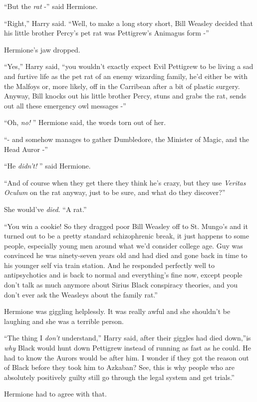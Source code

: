 ``But the \emph{rat} -'' said Hermione.

``Right,'' Harry said. ``Well, to make a long story short, Bill Weasley
decided that his little brother Percy's pet rat was Pettigrew's Animagus
form -''

Hermione's jaw dropped.

``Yes,'' Harry said, ``you wouldn't exactly expect Evil Pettigrew to be
living a sad and furtive life as the pet rat of an enemy wizarding
family, he'd either be with the Malfoys or, more likely, off in the
Carribean after a bit of plastic surgery. Anyway, Bill knocks out his
little brother Percy, stuns and grabs the rat, sends out all these
emergency owl messages -''

``Oh, \emph{no!} '' Hermione said, the words torn out of her.

``- and somehow manages to gather Dumbledore, the Minister of Magic, and
the Head Auror -''

``He \emph{didn't!} '' said Hermione.

``And of course when they get there they think he's crazy, but they use
\emph{Veritas Oculum} on the rat anyway, just to be sure, and what do
they discover?''

She would've \emph{died}. ``A rat.''

``You win a cookie! So they dragged poor Bill Weasley off to St. Mungo's
and it turned out to be a pretty standard schizophrenic break, it just
happens to some people, especially young men around what we'd consider
college age. Guy was convinced he was ninety-seven years old and had
died and gone back in time to his younger self via train station. And he
responded perfectly well to antipsychotics and is back to normal and
everything's fine now, except people don't talk as much anymore about
Sirius Black conspiracy theories, and you don't ever ask the Weasleys
about the family rat.''

Hermione was giggling helplessly. It was really awful and she shouldn't
be laughing and she was a terrible person.

``The thing I \emph{don't} understand,'' Harry said, after their giggles
had died down,''is \emph{why} Black would hunt down Pettigrew instead of
running as fast as he could. He had to know the Aurors would be after
him. I wonder if they got the reason out of Black before they took him
to Azkaban? See, this is why people who are absolutely positively guilty
still go through the legal system and get trials.''

Hermione had to agree with that.


